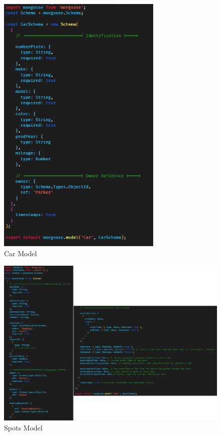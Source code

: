                     \begin{figure}[h]
                        \centering
                        \includegraphics[width=0.7\textwidth]{images/carsModel.png}
                        \caption{Car Model}
                        \label{fig:carsModel}
                    \end{figure}
  
                    \begin{figure}[h]
                        \centering
                        \includegraphics[width=1\textwidth]{images/spotModel.png}
                        \caption{Spots Model}
                        \label{fig:spotModel}
                    \end{figure}

